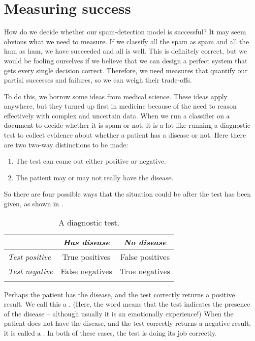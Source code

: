 \section{Measuring success}
\label{eval:sec}

How do we decide whether our spam-detection model is successful?
It may seem obvious what we need to measure. If we classify all the spam as spam and all the ham
 as ham, we have succeeded and all is well. This is definitely
correct, but we would be fooling ourselves if we believe that we
can design a perfect system that gets 
every single decision correct. 
Therefore, we need measures that quantify our partial 
successes and failures, so we can weigh their trade-offs.



To do this, we borrow some ideas from medical science. These ideas apply
anywhere, but they turned up first in medicine because of the need to
reason effectively with complex and uncertain data.  When we run a
classifier on a document to decide whether it is spam or not, it is a
lot like running a diagnostic test to collect evidence about whether a
patient has a disease or not. Here there are two two-way distinctions
to be made:

\begin{enumerate}
\item
The test can come out either positive
or negative.
\item The patient may or may not really have the disease.
\end{enumerate} 

So there are four possible ways that the situation could be after the
test has been given, as shown in . 


\begin{table}
\begin{tabular}{lcc} 
\lsptoprule
& \emph{Has disease} & \emph{No disease} \\ \midrule
\emph{Test positive} & True positives & False positives \\
\emph{Test negative} & False negatives & True negatives \\
\lspbottomrule
\end{tabular}
\caption{A diagnostic test.}
\label{tab:diagnostic}
\end{table}


Perhaps the patient has the disease, and the test correctly returns a
positive result.  We call this a . (Here, the word  means that the test indicates the presence of the disease -- although usually it is an emotionally  experience!)
 When the
patient does not have the disease, and the test correctly returns a
negative result, it is called a .  In both of
these cases, the test is doing its job correctly. 

